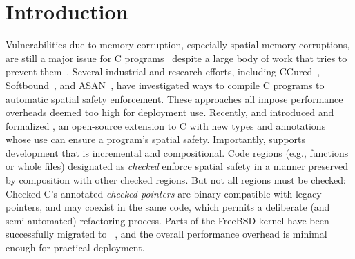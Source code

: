 \section{Introduction}\label{sec:intros}

Vulnerabilities due to memory corruption, especially spatial memory corruptions, 
are still a major issue for C programs~\cite{cvetrend, microsoftmemsafe, Zeng:2013:SRF:2534766.2534798} 
despite a large body of work that tries to prevent them~\cite{song2019sanitizing}.
Several industrial and research efforts, including CCured~\cite{Necula2005},
Softbound~\cite{softbound}, and ASAN~\cite{Serebryany2012},
have investigated ways to compile C programs 
to automatic spatial safety enforcement.
These approaches all impose performance overheads deemed too high for deployment use. 
Recently, \citet{Elliott2018} and \citet{li22checkedc} introduced and formalized \checkedc, an
open-source extension to C with new types and
annotations whose use can ensure a program’s spatial safety.
Importantly, \checkedc supports development that is 
incremental and compositional. Code regions (e.g.,
functions or whole files) designated as \emph{checked} enforce
spatial safety in a manner preserved by composition with
other checked regions. But not all regions must be checked: Checked
C's annotated \emph{checked pointers} are binary-compatible with legacy pointers, and
may coexist in the same code, which permits a deliberate (and
semi-automated) refactoring process. 
Parts of the FreeBSD kernel have
been successfully migrated to \checkedc~\cite{duanrefactoring}, and the overall performance
overhead is minimal enough for practical deployment.

